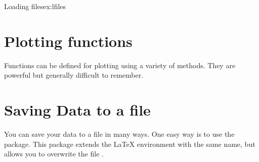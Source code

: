 \begin{texexample}[colback=white]{Loading files}{ex:lfiles}
\centering
{}
\end{texexample}


\begin{teXXX}
\end{teXXX}



\section*{Plotting functions}
Functions can be defined for plotting using a variety of methods. They are powerful but generally difficult to remember.



\section{Saving Data to a file}

You can save your data to a file in many ways. One easy way is to use
the  package. This package extends the LaTeX environment
with the same name, but allows you to overwrite the file {\protect{}}.

